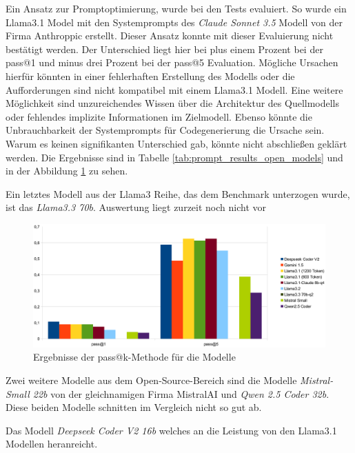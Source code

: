 Ein Ansatz zur Promptoptimierung, wurde bei den Tests evaluiert. So wurde ein Llama3.1 Model mit den Systemprompts des \textit{Claude Sonnet 3.5} Modell von der Firma Anthroppic erstellt. Dieser Ansatz konnte mit dieser Evaluierung nicht bestätigt werden. Der Unterschied liegt hier bei plus einem Prozent bei der pass@1 und minus drei Prozent bei der pass@5 Evaluation. Mögliche Ursachen hierfür könnten in einer fehlerhaften Erstellung des Modells oder die Aufforderungen sind nicht kompatibel mit einem Llama3.1 Modell. Eine weitere Möglichkeit sind unzureichendes Wissen über die Architektur des Quellmodells oder fehlendes implizite Informationen im Zielmodell. Ebenso könnte die Unbrauchbarkeit der Systemprompts für Codegenerierung die Ursache sein. Warum es keinen signifikanten Unterschied gab, könnte nicht abschließen geklärt werden. Die Ergebnisse sind in Tabelle \ref{tab:prompt_results_open_models} und in der Abbildung \ref{img:pass_at_k_results_by_llm} zu sehen.\vspace{0.2cm}

Ein letztes Modell aus der Llama3 Reihe, das dem Benchmark unterzogen wurde, ist das \textit{Llama3.3 70b}. Auswertung liegt zurzeit noch nicht vor\vspace{0.2cm}

\begin{figure}[!ht]
	\includegraphics[width=\textwidth]{content/chapter_evaluation/images/llm_evaluation.eps}
	\centering
	\caption{Ergebnisse der pass@k-Methode für die Modelle}
	\label{img:pass_at_k_results_by_llm}
\end{figure}

Zwei weitere Modelle aus dem Open-Source-Bereich sind die Modelle \textit{Mistral-Small 22b} von der gleichnamigen Firma MistralAI und \textit{Qwen 2.5 Coder 32b}. Diese beiden Modelle schnitten im Vergleich nicht so gut ab. \vspace{0.2cm}

Das Modell \textit{Deepseek Coder V2 16b} welches an die Leistung von den Llama3.1 Modellen heranreicht.\vspace{0.2cm}

